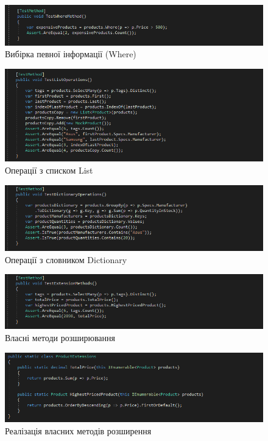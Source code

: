 \documentclass[oneside,14pt]{extarticle}
\begin{document}
\begin{normalsize}
	\begin{figure}[H]
		\centering
		\includegraphics[width=\textwidth]{2}
		\caption{Вибірка певної інформації (Where)}
	\end{figure}
	
	\begin{figure}[H]
		\centering
		\includegraphics[width=\textwidth]{31}
		\caption{Операції з списком List}
	\end{figure}
	
	\begin{figure}[H]
		\centering
		\includegraphics[width=\textwidth]{32}
		\caption{Операції з словником Dictionary}
	\end{figure}
	
	\begin{figure}[H]
		\centering
		\includegraphics[width=\textwidth]{4}
		\caption{Власні методи розширювання}
	\end{figure}
	
	\begin{figure}[H]
		\centering
		\includegraphics[width=\textwidth]{42}
		\caption{Реалізація власних методів розширення}
	\end{figure}
	

\end{normalsize}
\end{document}
